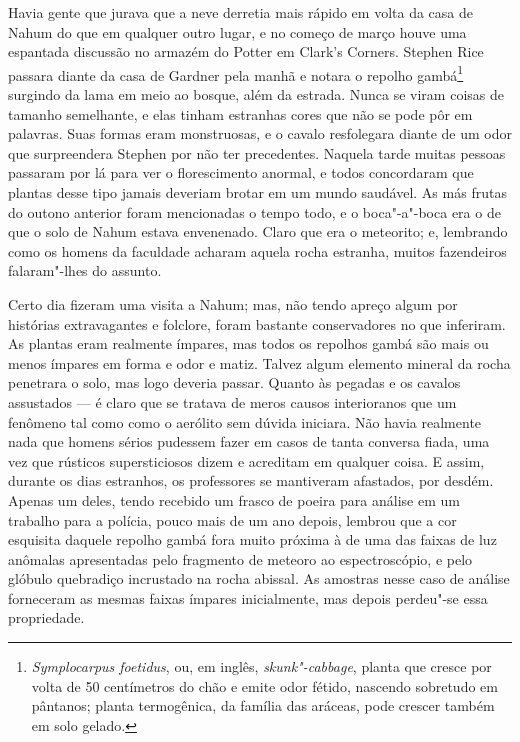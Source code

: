 Havia gente que jurava que a neve derretia mais rápido em volta da casa
de Nahum do que em qualquer outro lugar, e no começo de março houve uma
espantada discussão no armazém do Potter em Clark's Corners. Stephen
Rice passara diante da casa de Gardner pela manhã e notara o repolho
gambá\footnote{\textit{Symplocarpus foetidus}, ou, em inglês,
  \textit{skunk"-cabbage}, planta que cresce por volta de 50 centímetros do chão e
  emite odor fétido, nascendo sobretudo em pântanos; planta termogênica,
  da família das aráceas, pode crescer também em solo gelado.} surgindo
da lama em meio ao bosque, além da estrada. Nunca se viram coisas de
tamanho semelhante, e elas tinham estranhas cores que não se pode pôr em
palavras. Suas formas eram monstruosas, e o cavalo resfolegara diante de
um odor que surpreendera Stephen por não ter precedentes. Naquela tarde
muitas pessoas passaram por lá para ver o florescimento anormal, e todos
concordaram que plantas desse tipo jamais deveriam brotar em um mundo
saudável. As más frutas do outono anterior foram mencionadas o tempo
todo, e o boca"-a"-boca era o de que o solo de Nahum estava envenenado.
Claro que era o meteorito; e, lembrando como os homens da faculdade
acharam aquela rocha estranha, muitos fazendeiros falaram"-lhes do
assunto.

Certo dia fizeram uma visita a Nahum; mas, não tendo apreço algum por
histórias extravagantes e folclore, foram bastante conservadores no que
inferiram. As plantas eram realmente ímpares, mas todos os repolhos
gambá são mais ou menos ímpares em forma e odor e matiz. Talvez algum
elemento mineral da rocha penetrara o solo, mas logo deveria passar.
Quanto às pegadas e os cavalos assustados --- é claro que se tratava de
meros causos interioranos que um fenômeno tal como como o aerólito sem
dúvida iniciara. Não havia realmente nada que homens sérios pudessem
fazer em casos de tanta conversa fiada, uma vez que rústicos
supersticiosos dizem e acreditam em qualquer coisa. E assim, durante os
dias estranhos, os professores se mantiveram afastados, por desdém.
Apenas um deles, tendo recebido um frasco de poeira para análise em um
trabalho para a polícia, pouco mais de um ano depois, lembrou que a cor
esquisita daquele repolho gambá fora muito próxima à de uma das faixas
de luz anômalas apresentadas pelo fragmento de meteoro ao
espectroscópio, e pelo glóbulo quebradiço incrustado na rocha abissal.
As amostras nesse caso de análise forneceram as mesmas faixas ímpares
inicialmente, mas depois perdeu"-se essa propriedade.

